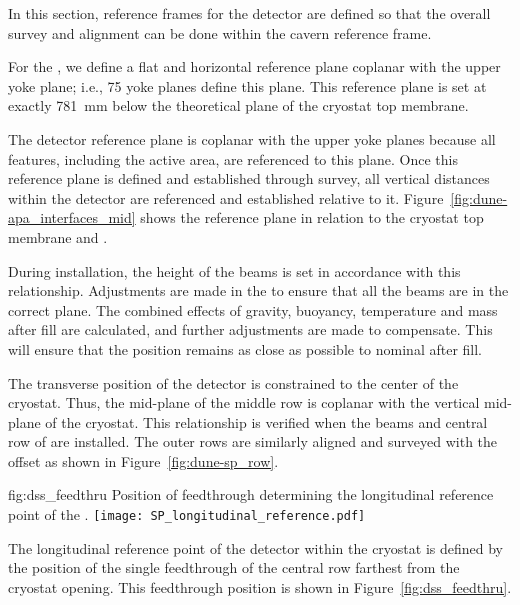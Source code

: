 In this section, reference frames for the detector are defined so that the
overall survey and alignment can be done within the cavern reference
frame. 


For the , we define a flat and horizontal reference plane
coplanar with the upper  yoke plane; i.e., 75 yoke planes
define this plane. This reference plane is set at exactly \SI{781}{mm}
below the theoretical plane of the cryostat top membrane.


The detector reference plane is coplanar with the upper 
yoke planes because all features, including the active area, are
referenced to this plane. Once this reference plane is defined and
established through survey, all vertical distances within the detector
are referenced and established relative to it.
Figure~\ref{fig:dune-apa_interfaces_mid} shows the reference plane in
relation to the cryostat top membrane and .


During installation, the height of the  beams is set in
accordance with this relationship. Adjustments are made in the
 to ensure that all the beams are in the correct plane. The
combined effects of gravity, buoyancy, temperature and 
mass after fill are calculated, and further adjustments are made to
compensate.  This will ensure that the  position remains as
close as possible to nominal after fill.


The transverse position of the detector is constrained to the center
of the cryostat. Thus, the mid-plane of the middle row  is
coplanar with the vertical mid-plane of the cryostat. This
relationship is verified when the  beams and central row of
 are installed. The outer rows are similarly aligned and
surveyed with the offset as shown in Figure~\ref{fig:dune-sp_row}.
\begin{dunefigure}{fig:dss_feedthru}
  {Position of feedthrough determining the longitudinal reference point of the .}
  \texttt{[image: SP\_longitudinal\_reference.pdf]}
\end{dunefigure}


The longitudinal reference point of the detector within the cryostat
is defined by the position of the single feedthrough of the central row
farthest from the cryostat opening. This feedthrough position
is shown in Figure~\ref{fig:dss_feedthru}.

